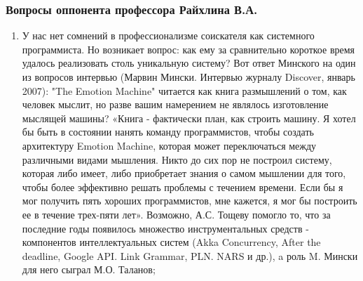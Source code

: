 \documentclass[14pt]{beamer}
\begin{document}
\begin{frame}
\frametitle{Вопросы оппонента профессора Райхлина В.А.}
\begin{enumerate}
\scriptsize 
  \item У нас нет сомнений в профессионализме соискателя как системного программиста. Но возникает вопрос: как ему за сравнительно короткое время удалось реализовать столь уникальную систему? Вот ответ Минского на один из вопросов интервью (Марвин Мински. Интервью журналу Discover, январь 2007): "The Emotion Machine" читается как книга размышлений о том, как человек мыслит, но разве вашим намерением не являлось изготовление мыслящей машины? «Книга - фактически план, как строить машину. Я хотел бы быть в состоянии нанять команду программистов, чтобы создать архитектуру Emotion Machine, которая может переключаться между различными видами мышления. Никто до сих пор не построил систему, которая либо имеет, либо приобретает знания о самом мышлении для того, чтобы более эффективно решать проблемы с течением времени. Если бы я мог получить пять хороших программистов, мне кажется, я мог бы построить ее в течение трех-пяти лет». Возможно, А.С. Тощеву помогло то, что за последние годы появилось множество инструментальных средств - компонентов интеллектуальных систем (Akka Concurrency, After the deadline, Google API. Link Grammar, PLN. NARS и др.), a роль M. Мински для него сыграл М.О. Таланов;

  \end{enumerate}
\end{frame}
\end{document}
